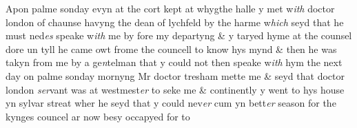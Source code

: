 \documentclass[12pt, a4paper]{book}
\begin{document}
		\ifthenelse{\isodd{\thepage}}
		{\reversemarginpar}
		{\normalmarginpar}
		Apon palme sonday evyn at the cort kept at whygthe halle y met w\textit{ith} doctor london of chaunse havyng the dean of lychfeld by the harme w\textit{hich} seyd that he must ned\textit{es} speake w\textit{ith} me by fore my departyng \& y taryed hyme at the counsel dore un tyll he came owt frome the councell to know hys mynd \& then he was takyn from me by a ge\textit{n}telman that y could not then
			 speake w\textit{ith} hym the next day on palme sonday mornyng Mr doctor tresham mette me \& seyd that doctor london \textit{ser}vant was at westmest\textit{er} to seke me \& continently y went to hys house yn sylvar streat wher he seyd that y could  nev\textit{er} cum yn bett\textit{er} season for the kynges councel ar now besy occapyed for to
	
	
		
				\marginpar[\vspace{0.5cm}{\textcolor{Gray}{n}}]{}
			
\end{document}
